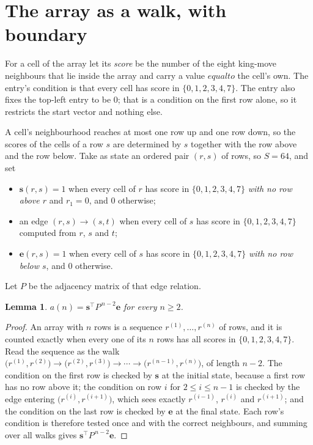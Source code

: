 \documentclass[11pt,a4paper]{article}
\theoremstyle{plain}
\newtheorem{lemma}[theorem]{Lemma}
\theoremstyle{definition}
\begin{document}
\section{The array as a walk, with boundary}

For a cell of the array let its \emph{score} be the number of the eight king-move neighbours that lie inside
the array and carry a value $equal to$ the cell's own. The entry's condition is that every cell
has score in $\{0,1,2,3,4,7\}$. The entry also fixes the top-left entry to be $0$; that is a condition on the first row alone, so it restricts the start vector and nothing else.

A cell's neighbourhood reaches at most one row up and one row down, so the scores of the
cells of a row $s$ are determined by $s$ together with the row above and the row below.
Take as state an ordered pair $(r,s)$ of rows, so $S=64$, and set
\begin{itemize}
\item $\mathbf{s}(r,s)=1$ when every cell of $r$ has score in $\{0,1,2,3,4,7\}$ \emph{with no row
above $r$} and $r_1=0$, and $0$ otherwise;
\item an edge $(r,s)\to(s,t)$ when every cell of $s$ has score in $\{0,1,2,3,4,7\}$ computed from
$r$, $s$ and $t$;
\item $\mathbf{e}(r,s)=1$ when every cell of $s$ has score in $\{0,1,2,3,4,7\}$ \emph{with no row
below $s$}, and $0$ otherwise.
\end{itemize}
Let $P$ be the adjacency matrix of that edge relation.

\begin{lemma}\label{lem:walk}
$a(n)=\mathbf{s}^{\!\top}P^{\,n-2}\mathbf{e}$ for every $n\ge2$.
\end{lemma}

\begin{proof}
An array with $n$ rows is a sequence $r^{(1)},\dots,r^{(n)}$ of rows, and it is counted
exactly when every one of its $n$ rows has all scores in $\{0,1,2,3,4,7\}$. Read the sequence as the
walk $\bigl(r^{(1)},r^{(2)}\bigr)\to\bigl(r^{(2)},r^{(3)}\bigr)\to\cdots\to
\bigl(r^{(n-1)},r^{(n)}\bigr)$, of length $n-2$. The condition on the first row is
checked by $\mathbf{s}$ at the initial state, because a first row has no row above it; the
condition on row $i$ for $2\le i\le n-1$ is checked by the edge entering
$\bigl(r^{(i)},r^{(i+1)}\bigr)$, which sees exactly $r^{(i-1)}$, $r^{(i)}$ and
$r^{(i+1)}$; and the condition on the last row is checked by $\mathbf{e}$ at the final
state. Each row's condition is therefore tested once and with the correct neighbours, and
summing over all walks gives $\mathbf{s}^{\!\top}P^{\,n-2}\mathbf{e}$.
\end{proof}
\end{document}
